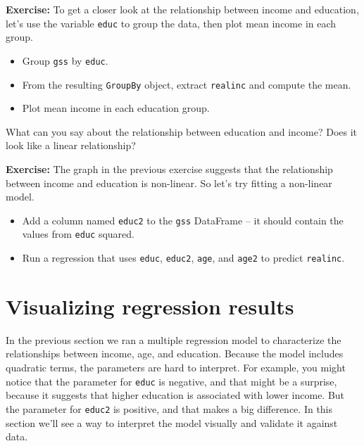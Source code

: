\textbf{Exercise:} To get a closer look at the relationship between
income and education, let's use the variable
\passthrough{\lstinline!educ!} to group the data, then plot mean income
in each group.

\begin{itemize}
\item
  Group \passthrough{\lstinline!gss!} by \passthrough{\lstinline!educ!}.
\item
  From the resulting \passthrough{\lstinline!GroupBy!} object, extract
  \passthrough{\lstinline!realinc!} and compute the mean.
\item
  Plot mean income in each education group.
\end{itemize}

What can you say about the relationship between education and income?
Does it look like a linear relationship?

\textbf{Exercise:} The graph in the previous exercise suggests that the
relationship between income and education is non-linear. So let's try
fitting a non-linear model.

\begin{itemize}
\item
  Add a column named \passthrough{\lstinline!educ2!} to the
  \passthrough{\lstinline!gss!} DataFrame -- it should contain the
  values from \passthrough{\lstinline!educ!} squared.
\item
  Run a regression that uses \passthrough{\lstinline!educ!},
  \passthrough{\lstinline!educ2!}, \passthrough{\lstinline!age!}, and
  \passthrough{\lstinline!age2!} to predict
  \passthrough{\lstinline!realinc!}.
\end{itemize}

\hypertarget{visualizing-regression-results}{%
\section{Visualizing regression
results}\label{visualizing-regression-results}}

In the previous section we ran a multiple regression model to
characterize the relationships between income, age, and education.
Because the model includes quadratic terms, the parameters are hard to
interpret. For example, you might notice that the parameter for
\passthrough{\lstinline!educ!} is negative, and that might be a
surprise, because it suggests that higher education is associated with
lower income. But the parameter for \passthrough{\lstinline!educ2!} is
positive, and that makes a big difference. In this section we'll see a
way to interpret the model visually and validate it against data.

